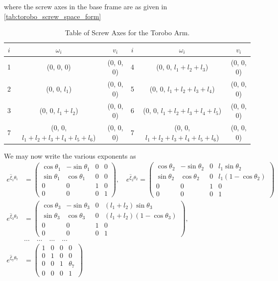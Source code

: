 %
where the screw axes in the base frame are as given in \autoref{tab:torobo_screw_space_form}
%
\begin{table}[tbph!]
	\caption{Table of Screw Axes for the Torobo Arm.}
	\centering
	\begin{tabular}{|c|c|c|| c|c|c|}
		\hline \rule[-2ex]{0pt}{5.5ex}  
		$i$ & $\omega_i$ & $v_i$ & $i$ & $\omega_i$ & $v_i$\\
		\hline \rule[-2ex]{0pt}{5.5ex}  
		1  & (0, 0, 0) & (0, 0, 0) & 4  & (0, 0, $l_1+l_2+l_3$) & (0, 0, 0) \\	
		\hline \rule[-2ex]{0pt}{5.5ex}  
		2  & (0, 0, $l_1$) & (0, 0, 0) & 5  & (0, 0, $l_1+l_2+l_3+l_4$) & (0, 0, 0)  \\
		\hline \rule[-2ex]{0pt}{5.5ex}  
		3  & (0, 0, $l_1+l_2$) & (0, 0, 0) & 6  & (0, 0, $l_1+l_2+l_3+l_4+l_5$) & (0, 0, 0)  \\
		\hline \rule[-2ex]{0pt}{5.5ex}  
		7  & (0, 0, $l_1+l_2+l_3+l_4+l_5+l_6$) & (0, 0, 0)  & 7  & (0, 0, $l_1+l_2+l_3+l_4+l_5+l_6$) & (0, 0, 0) \\
		\hline
	\end{tabular}
\label{tab:torobo_screw_space_form}
\end{table}
%
We may now write the various exponents as 
%
\begin{subequations}
	\begin{align} 
	e^{\hat{\xi}_1 \theta_1} &= \left(\begin{array}{cccc}
	\cos \theta_1 & -\sin \theta_1 & 0 & 0 \\
	\sin \theta_1 & \cos \theta_1 & 0 & 0 \\
	0 & 0 & 1 & 0 \\
	0 & 0 & 0 & 1
	\end{array}\right), \quad
	e^{\hat{\xi}_2 \theta_2} = \left(\begin{array}{cccc}
	\cos \theta_2 & -\sin \theta_2 & 0 & l_1 \sin\theta_2 \\
	\sin \theta_2 & \cos \theta_2 & 0 & l_1 (1-\cos \theta_2) \\
	0 & 0 & 1 & 0 \\
	0 & 0 & 0 & 1
	\end{array}\right) \\
	e^{\hat{\xi}_3 \theta_3} &= \left(\begin{array}{cccc}
	\cos \theta_3 & -\sin \theta_3 & 0 & (l_1 + l_2)\sin\theta_3  \\
	\sin \theta_3 & \cos \theta_3 & 0 & (l_1 + l_2) (1-\cos \theta_3)\\
	0 & 0 & 1 & 0 \\
	0 & 0 & 0 & 1
	\end{array}\right), \quad
	\nonumber \\
	& \ldots \quad \ldots\quad \ldots\quad \ldots
	\nonumber \\
	e^{\hat{\xi}_7 \theta_7} &= \left(\begin{array}{cccc}
	1 & 0 & 0 & 0 \\
	0 & 1 & 0 & 0 \\
	0 & 0 & 1 & \theta_7 \\
	0 & 0 & 0 & 1
	\end{array}\right)
	\end{align}  
\end{subequations}
